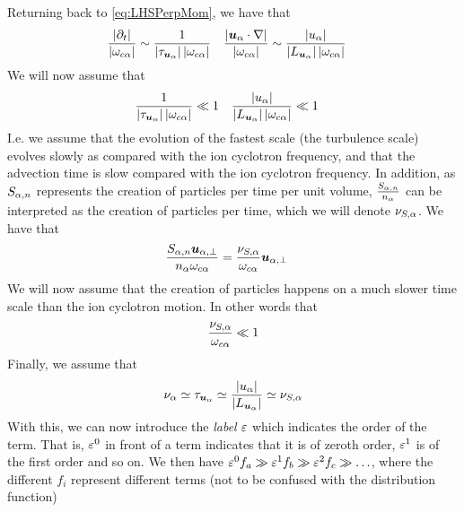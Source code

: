Returning back to \cref{eq:LHSPerpMom}, we have that
%
\begin{align*}
 &\frac{\L|\partial_t\R|}{\L|\om_{c\a}\R|}  \sim
 \frac{1}{\L|\tau_{\ve{u}_\a}\R|\L|\om_{c\a}\R|}&
%
 &\frac{\L|\ve{u}_{\a}\cdot\nabla\R|}{\L|\om_{c\a}\R|} \sim
 \frac{\L|u_{\a}\R|}{\L|L_{\ve{u}_\a}\R|\L|\om_{c\a}\R|}
\end{align*}
%
We will now assume that
%
\begin{align*}
 &\frac{1}{\L|\tau_{\ve{u}_\a}\R|\L|\om_{c\a}\R|} \ll 1&
%
 &\frac{\L|u_{\a}\R|}{\L|L_{\ve{u}_\a}\R|\L|\om_{c\a}\R|} \ll 1
\end{align*}
%
I.e. we assume that the evolution of the fastest scale (the turbulence scale) evolves slowly as compared with the ion cyclotron frequency, and that the advection time is slow compared with the ion cyclotron frequency.
In addition, as $S_{\alpha,n}$ represents the creation of particles per time per unit volume, $\frac{S_{\alpha,n}}{n_\alpha}$ can be interpreted as the creation of particles per time, which we will denote $\nu_{S,\alpha}$.
We have that
%
\begin{align*}
 \frac{
     S_{\alpha,n}\boldsymbol{u}_{\alpha,\perp}
 }{n_\alpha \omega_{c\alpha}}
 &=
 \frac{
     \nu_{S,\alpha}
 }{ \omega_{c\alpha}}
\boldsymbol{u}_{\alpha,\perp}
\end{align*}
%
We will now assume that the creation of particles happens on a much slower time  scale than the ion cyclotron motion.
In other words that
%
\begin{align*}
 \frac{
     \nu_{S,\alpha}
 }{ \omega_{c\alpha}}
 \ll
 1
\end{align*}
%
Finally, we assume that
%
\begin{align*}
 \nu_\alpha \simeq
 \tau_{\boldsymbol{u}_\alpha} \simeq
 \frac{\left|u_{\alpha}\right|}{\left|L_{\boldsymbol{u}_\alpha}\right|}\simeq
 \nu_{S,\alpha}
\end{align*}
%
With this, we can now introduce the \emph{label} $\varepsilon$ which indicates the order of the term.
That is, $\varepsilon^0$ in front of a term indicates that it is of zeroth order, $\varepsilon^1$ is of the first order and so on.
We then have $\varepsilon^0 f_a \gg \varepsilon^1 f_b \gg \varepsilon^2 f_c \gg \ldots$, where the different $f_i$ represent different terms (not to be confused with the distribution function)

